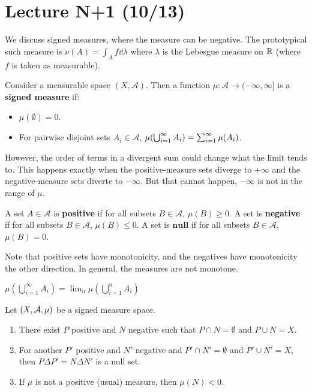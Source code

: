 
\section{Lecture N+1 (10/13)}
We discuss signed measures, where the measure can be negative.
The prototypical such measure is $\nu(A) = \int_A f \dd{\lambda}$ where $\lambda$ is the Lebesgue
measure on $\operatorname{\mathbb{R}}$ (where $f$ is taken as measurable).
\begin{definition}
Consider a measurable space $(X, \mathcal{A})$.
Then a function $\mu: \mathcal{A} \to (-\infty, \infty]$ is a \textbf{signed measure} if:
\begin{itemize}
    \item $\mu(\emptyset) = 0$.
    \item For pairwise disjoint sets $A_i \in \mathcal{A}$, $\mu\qty(\bigcup_{i = 1}^{\infty} A_i) = \sum_{i = 1}^{\infty} \mu(A_i)$.
\end{itemize}
\end{definition}
However, the order of terms in a divergent sum could change what the limit
tends to. This happens exactly when the positive-measure sets diverge to $+\infty$ and the negative-measure sets
diverte to $-\infty$. But that cannot happen, $-\infty$ is not in the range of $\mu$.
\begin{definition}
    A set $A \in \mathcal{A}$ is \textbf{positive} if for all subsets $B \in \mathcal{A}$,
    $\mu(B) \ge 0$. A set is \textbf{negative} if for all subsets $B \in \mathcal{A}$, $\mu(B) \le 0$.
    A set is $\textbf{null}$ if for all subsets $B \in \mathcal{A}$, $\mu(B) = 0$.
\end{definition}
Note that positive sets have monotonicity, and the negatives have monotonicity the other direction.
In general, the measures are not monotone.
\begin{theorem}
    $\mu(\bigcup_{i = 1}^{\infty} A_i) = \lim_n \mu(\bigcup_{i = 1}^n A_i)$
\end{theorem}

\begin{theorem}
    Let $(X, \mathcal{A}, \mu)$ be a signed measure space.
    \begin{enumerate}
        \item There exist $P$ positive and $N$ negative such that $P \cap N = \emptyset$ and $P \cup N = X$.
        \item For another $P'$ positive and $N'$ negative and $P' \cap N' = \emptyset$ and $P' \cup N' = X$, then $P \Delta P' = N \Delta N'$ is a null set.
        \item If $\mu$ is not a positive (usual) measure, then $\mu(N) < 0$.
    \end{enumerate}
\end{theorem}

